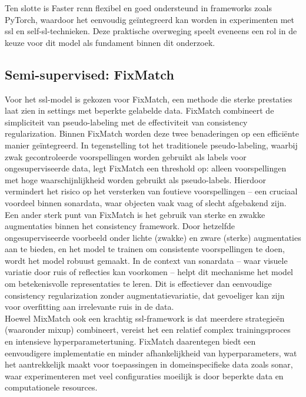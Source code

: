 Ten slotte is Faster \gls{rcnn} flexibel en goed ondersteund in frameworks zoals PyTorch, waardoor het eenvoudig geïntegreerd kan worden in experimenten met \gls{ssl} en \gls{self-sl}-technieken. Deze praktische overweging speelt eveneens een rol in de keuze voor dit model als fundament binnen dit onderzoek.

\subsection{Semi-supervised: FixMatch}

Voor het \gls{ssl}-model is gekozen voor FixMatch, een methode die sterke prestaties laat zien in settings met beperkte gelabelde data. FixMatch combineert de simpliciteit van pseudo-labeling met de effectiviteit van consistency regularization. Binnen FixMatch worden deze twee benaderingen op een efficiënte manier geïntegreerd. In tegenstelling tot het traditionele pseudo-labeling, waarbij zwak gecontroleerde voorspellingen worden gebruikt als labels voor ongesuperviseerde data, legt FixMatch een threshold op: alleen voorspellingen met hoge waarschijnlijkheid worden gebruikt als pseudo-labels. Hierdoor vermindert het risico op het versterken van foutieve voorspellingen -- een cruciaal voordeel binnen sonardata, waar objecten vaak vaag of slecht afgebakend zijn. \\

Een ander sterk punt van FixMatch is het gebruik van sterke en zwakke augmentaties binnen het consistency framework. Door hetzelfde ongesuperviseerde voorbeeld onder lichte (zwakke) en zware (sterke) augmentaties aan te bieden, en het model te trainen om consistente voorspellingen te doen, wordt het model robuust gemaakt. In de context van sonardata -- waar visuele variatie door ruis of reflecties kan voorkomen -- helpt dit mechanisme het model om betekenisvolle representaties te leren. Dit is effectiever dan eenvoudige consistency regularization zonder augmentatievariatie, dat gevoeliger kan zijn voor overfitting aan irrelevante ruis in de data. \\

Hoewel MixMatch ook een krachtig \gls{ssl}-framework is dat meerdere strategieën (waaronder mixup) combineert, vereist het een relatief complex trainingsproces en intensieve hyperparametertuning. FixMatch daarentegen biedt een eenvoudigere implementatie en minder afhankelijkheid van hyperparameters, wat het aantrekkelijk maakt voor toepassingen in domeinspecifieke data zoals sonar, waar experimenteren met veel configuraties moeilijk is door beperkte data en computationele resources. \\

